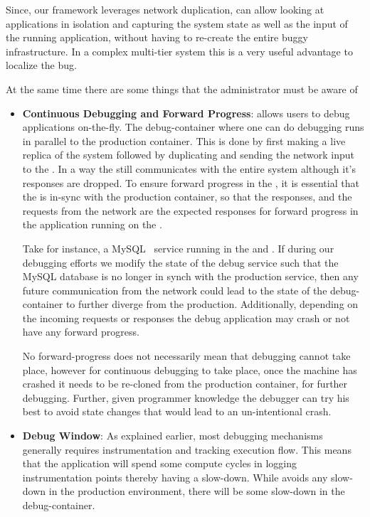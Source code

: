 \begin{itemize}
	Since, our framework leverages network duplication, \parikshan can allow looking at applications in isolation and capturing the system state as well as the input of the running application, without having to re-create the entire buggy infrastructure. 
	In a complex multi-tier system this is a very useful advantage to localize the bug.
	
	
\end{itemize}

At the same time there are some things that the administrator must be aware of

\begin{itemize}
	\item \textbf{Continuous Debugging and Forward Progress}:
	\livedebugging allows users to debug applications on-the-fly. The debug-container where one can do debugging runs in parallel to the production container. This is done by first making a live replica of the system followed by duplicating and sending the network input to the \debugcontainer. 
	In a way the \debugcontainer still communicates with the entire system although it's responses are dropped. 
	To ensure forward progress in the \debugcontainer, it is essential that the \debugcontainer is in-sync with the production container, so that the responses, and the requests from the network are the expected responses for forward progress in the application running on the \debugcontainer.
	
	Take for instance, a MySQL~\cite{mysql} service running in the \productioncontainer and \debugcontainer. If during our debugging efforts we modify the state of the debug service such that the MySQL database is no longer in synch with the production service, then any future communication from the network could lead to the state of the debug-container to further diverge from the production. Additionally, depending on the incoming requests or responses the debug application may crash or not have any forward progress.
	
	No forward-progress does not necessarily mean that debugging cannot take place, however for continuous debugging to take place, once the machine has crashed it needs to be re-cloned from the production container, for further debugging. Further, given programmer knowledge the debugger can try his best to avoid state changes that would lead to an un-intentional crash.
	
	\item \textbf{Debug Window}:
	As explained earlier, most debugging mechanisms generally requires instrumentation and tracking execution flow. This means that the application will spend some compute cycles in logging instrumentation points thereby having a slow-down. While \parikshan avoids any slow-down in the production environment, there will be some slow-down in the debug-container. 
	

\end{itemize}
